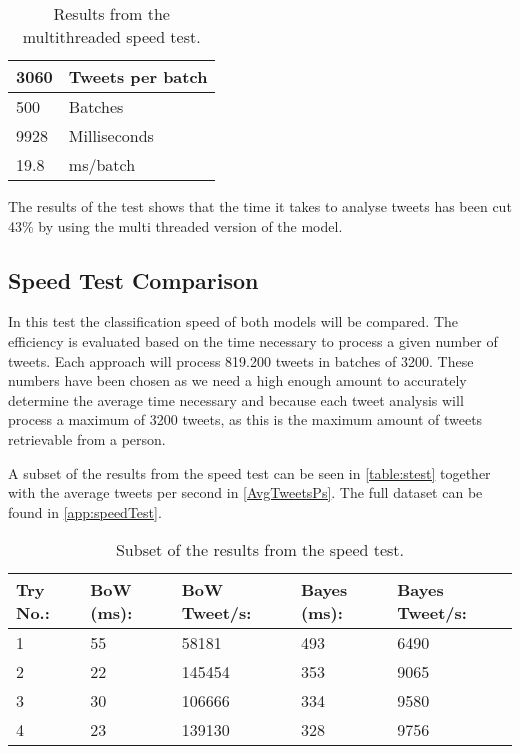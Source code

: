 \begin{table}[H]\centering
\begin{tabular}{|l|l|}
\hline
3060	&	Tweets per batch 	\\\hline
500		&	Batches				\\\hline
9928 	&	Milliseconds		\\\hline
19.8	&	ms/batch 			\\\hline
\end{tabular}
\caption{Results from the multithreaded speed test.}
\label{speedTestResMultiThread}
\end{table}



The results of the test shows that the time it takes to analyse tweets has been
cut 43\% by using the multi threaded version of the model. 

\subsection{Speed Test Comparison}
In this test the classification speed of both models will be compared. The
efficiency is evaluated based on the time necessary to process a given
number of tweets. Each approach will process 819.200 tweets in batches
of 3200. These numbers have been chosen as we need a high enough amount to
accurately determine the average time necessary and because each tweet
analysis will process a maximum of 3200 tweets, as this is the maximum amount
of tweets retrievable from a person.\nl

A subset of the results from the speed test can be seen in \autoref{table:stest}
together with the average tweets per second in \autoref{AvgTweetsPs}. The
full dataset can be found in \autoref{app:speedTest}.

\begin{table}[H]\centering
\begin{tabular}{|l|l|l|l|l|}
\hline
\textbf{Try No.:}	&	\textbf{BoW (ms):}	&	\textbf{BoW Tweet/s:}	&	\textbf{Bayes
(ms):}	& \textbf{Bayes Tweet/s:} \\\hline 
1	&	55	&	58181	&	493	&	6490 \\\hline
2	&	22	&	145454	&	353	&	9065 \\\hline
3	&	30	&	106666	&	334	&	9580 \\\hline
4	&	23	&	139130	&	328	&	9756 \\\hline		
\end{tabular}
\caption{Subset of the results from the speed test.}
\label{table:stest}
\end{table}

